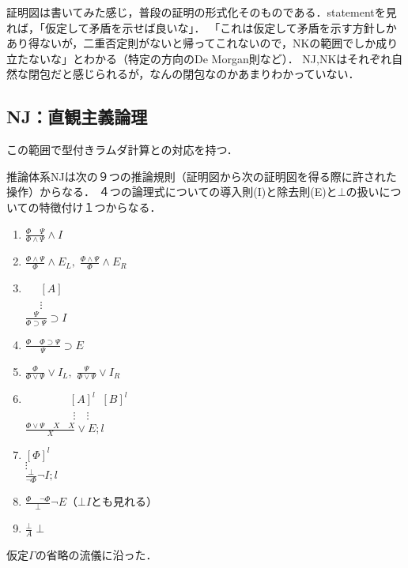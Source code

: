 \documentclass[uplatex, 12pt, dvipdfmx]{jsreport}
\begin{document}
\begin{screen}
    証明図は書いてみた感じ，普段の証明の形式化そのものである．statementを見れば，「仮定して矛盾を示せば良いな」．
    「これは仮定して矛盾を示す方針しかあり得ないが，二重否定則がないと帰ってこれないので，NKの範囲でしか成り立たないな」とわかる（特定の方向のDe Morgan則など）．
    NJ,NKはそれぞれ自然な閉包だと感じられるが，なんの閉包なのかあまりわかっていない．
\end{screen}

\subsection{NJ：直観主義論理}
この範囲で型付きラムダ計算との対応を持つ．

\begin{definition}[NJ]
    推論体系NJは次の９つの推論規則（証明図から次の証明図を得る際に許された操作）からなる．
    ４つの論理式についての導入則(I)と除去則(E)と$\bot$の扱いについての特徴付け１つからなる．
    \begin{enumerate}
        \item $\frac{\Phi\;\;\;\;\Psi}{\Phi\land\Psi}\land I$
        \item $\frac{\Phi\land\Psi}{\Phi}\land E_L,\;\frac{\Phi\land\Psi}{\Phi}\land E_R$
        \item 　 $[A]$\\
        　 $\vdots$\\
        $\frac{\Psi}{\Phi\supset\Psi}\supset I$
        \item $\frac{\Phi\;\;\;\;\Phi\supset\Psi}{\Psi}\supset E$
        \item $\frac{\Phi}{\Phi\lor\Psi}\lor I_L,\;\frac{\Psi}{\Phi\lor\Psi}\lor I_R$
        \item  　　　　$[A]^l\;\;[B]^l$\\
        　 　　　$\vdots$　$\vdots$\\
        $\frac{\Phi\lor\Psi\;\;\;\;X\;\;\;\;X}{X}\lor E;l$
        \item  $[\Phi]^l$\\
        $\vdots$\\
        $\frac{\bot}{\lnot\Phi}\lnot I;l$
        \item $\frac{\Phi\;\;\;\;\lnot\Phi}{\bot}\lnot E$（$\bot I$とも見れる）
        \item $\frac{\bot}{A}\;\bot$
    \end{enumerate}
    仮定$\Gamma$の省略の流儀に沿った．
\end{definition}
\end{document}
